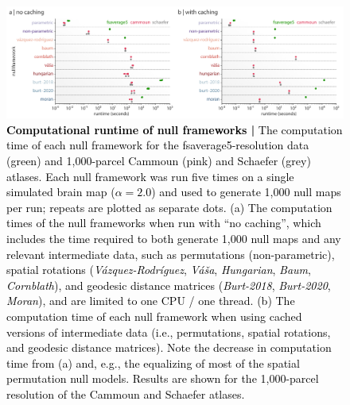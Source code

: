\documentclass[12pt,aps,pra,reprint,showkeys]{revtex4-1}
\newcommand{\nimg}[1]{\textcolor{black}{{#1}}}
\begin{document}
\begin{figure}[htp]
  \begin{center}
    \centerline{\includegraphics[width=\textwidth]{runtime_results.png}}
    \caption{
      \nimg{\textbf{Computational runtime of null frameworks |}
      The computation time of each null framework for the fsaverage5-resolution data (green) and 1,000-parcel Cammoun (pink) and Schaefer (grey) atlases.
      Each null framework was run five times on a single simulated brain map ($\alpha = 2.0$) and used to generate 1,000 null maps per run; repeats are plotted as separate dots.
      (a) The computation times of the null frameworks when run with ``no caching'', which includes the time required to both generate 1,000 null maps and any relevant intermediate data, such as permutations (non-parametric), spatial rotations (\textit{V{\'a}zquez-Rodr{\'i}guez}, \textit{V{\'a}{\v{s}}a}, \textit{Hungarian}, \textit{Baum}, \textit{Cornblath}), and geodesic distance matrices (\textit{Burt-2018}, \textit{Burt-2020}, \textit{Moran}), and are limited to one CPU / one thread.
      (b) The computation time of each null framework when using cached versions of intermediate data (i.e., permutations, spatial rotations, and geodesic distance matrices).
      Note the decrease in computation time from (a) and, e.g., the equalizing of most of the spatial permutation null models.
      Results are shown for the 1,000-parcel resolution of the Cammoun and Schaefer atlases.}
    }
    \label{supp-figure-runtime-results}
  \end{center}
\end{figure}
\end{document}
